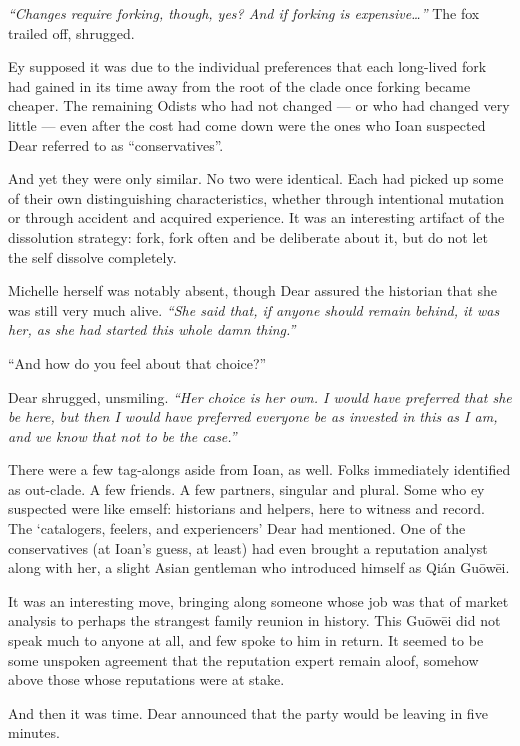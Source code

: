 \emph{``Changes require forking, though, yes? And if forking is expensive\ldots{}''} The fox trailed off, shrugged.

Ey supposed it was due to the individual preferences that each long-lived fork had gained in its time away from the root of the clade once forking became cheaper. The remaining Odists who had not changed — or who had changed very little — even after the cost had come down were the ones who Ioan suspected Dear referred to as ``conservatives''.

And yet they were only similar. No two were identical. Each had picked up some of their own distinguishing characteristics, whether through intentional mutation or through accident and acquired experience. It was an interesting artifact of the dissolution strategy: fork, fork often and be deliberate about it, but do not let the self dissolve completely.

Michelle herself was notably absent, though Dear assured the historian that she was still very much alive. \emph{``She said that, if anyone should remain behind, it was her, as she had started this whole damn thing.''}

``And how do you feel about that choice?''

Dear shrugged, unsmiling. \emph{``Her choice is her own. I would have preferred that she be here, but then I would have preferred everyone be as invested in this as I am, and we know that not to be the case.''}

There were a few tag-alongs aside from Ioan, as well. Folks immediately identified as out-clade. A few friends. A few partners, singular and plural. Some who ey suspected were like emself: historians and helpers, here to witness and record. The `catalogers, feelers, and experiencers' Dear had mentioned. One of the conservatives (at Ioan's guess, at least) had even brought a reputation analyst along with her, a slight Asian gentleman who introduced himself as Qián Guōwēi.

It was an interesting move, bringing along someone whose job was that of market analysis to perhaps the strangest family reunion in history. This Guōwēi did not speak much to anyone at all, and few spoke to him in return. It seemed to be some unspoken agreement that the reputation expert remain aloof, somehow above those whose reputations were at stake.

And then it was time. Dear announced that the party would be leaving in five minutes.
